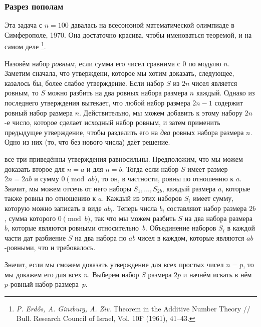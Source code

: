 \documentclass[twoside]{book}
\begin{document}
\subsubsection*{Разрез пополам}

Эта задача с $n=100$ давалась на  всесоюзной математической олимпиаде в Симферополе, 1970.
Она достаточно красива, чтобы именоваться теоремой, и на самом деле%
\footnote{\emph{P. Erd\H{o}s, A. Ginzburg, A. Ziv}. Theorem in the Additive Number Theory /\!/ {Bull. Research Council of Israel}, Vol. 10F (1961), 41--43.}.


Назовём набор \emph{ровным}, если сумма его чисел сравнима с $0$ по модулю $n$.
Заметим сначала, что  утверждени, которое мы хотим доказать,  следующее, казалось бы, более слабое утверждение. 
Если набор $S$ из $2n$ чисел является ровным, то $S$ можно разбить на два ровных набора размера $n$ каждый.
Однако из последнего утверждения вытекает, что любой набор размера $2n-1$ содержит ровный набор размера $n$.
Действительно, мы можем добавить к этому набору $2n$-е число, которое сделает исходный набор ровным, и затем применить предыдущее утверждение, чтобы разделить его на \emph{два} ровных набора размера $n$. 
Одно из них (то, что без нового числа) даёт решение.

 все три приведённы утверждения равносильны.
Предположим, что мы можем доказать второе  для $n = a$ и для $n = b$.
Тогда если набор $S$ имеет размер $2n = 2ab$ и сумму $0 \pmod {ab}$, то он, в частности,  ровны по отношению к $a$. 
Значит, мы можем отсечь от него наборы $S_1,\dots,S_{2b}$, каждый размера $a$, которые также  ровны по отношению к $a$.
Каждый из этих наборов $S_i$ имеет сумму, которую можно записать в виде $ab_i$.
Теперь числа $b_i$ составляют набор размера $2b$, сумма которого  $0 \pmod b$, так что мы можем разбить $S$ на два набора размера $b$, которые являются ровными относительно~$b$.
Объединение наборов $S_i$ в каждой части дат разбиение  $S$ на два набора по $ab$ чисел в каждом, которые являются $ab$-ровными,  что и требовалось.

Значит, если мы сможем доказать утверждение для всех простых чисел $n=p$, то мы докажем его для всех $n$.
Выберем набор $S$ размера $2p$ и начнём искать в нём $p$-ровный набор размера~$p$.
\end{document}
